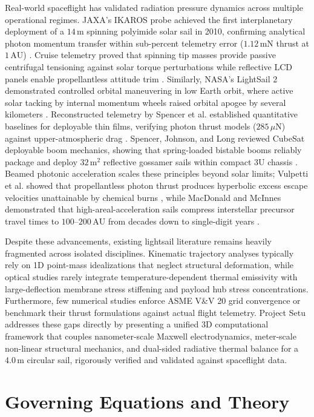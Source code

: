 \documentclass[aps,prd,reprint,superscriptaddress,nofootinbib,floatfix]{revtex4-2}
\begin{document}
Real-world spaceflight has validated radiation pressure dynamics across multiple operational regimes. JAXA's IKAROS probe achieved the first interplanetary deployment of a $14\,\mathrm{m}$ spinning polyimide solar sail in 2010, confirming analytical photon momentum transfer within sub-percent telemetry error ($1.12\,\mathrm{mN}$ thrust at $1\,\mathrm{AU}$) \cite{ref24}. Cruise telemetry proved that spinning tip masses provide passive centrifugal tensioning against solar torque perturbations while reflective LCD panels enable propellantless attitude trim \cite{ref25}. Similarly, NASA's LightSail 2 demonstrated controlled orbital maneuvering in low Earth orbit, where active solar tacking by internal momentum wheels raised orbital apogee by several kilometers \cite{ref26}. Reconstructed telemetry by Spencer et al. established quantitative baselines for deployable thin films, verifying photon thrust models ($285\,\mu\mathrm{N}$) against upper-atmospheric drag \cite{ref27}. Spencer, Johnson, and Long reviewed CubeSat deployable boom mechanics, showing that spring-loaded bistable booms reliably package and deploy $32\,\mathrm{m}^2$ reflective gossamer sails within compact 3U chassis \cite{ref28}. Beamed photonic acceleration scales these principles beyond solar limits; Vulpetti et al. showed that propellantless photon thrust produces hyperbolic excess escape velocities unattainable by chemical burns \cite{ref29}, while MacDonald and McInnes demonstrated that high-areal-acceleration sails compress interstellar precursor travel times to $100\text{--}200\,\mathrm{AU}$ from decades down to single-digit years \cite{ref30}.

Despite these advancements, existing lightsail literature remains heavily fragmented across isolated disciplines. Kinematic trajectory analyses typically rely on 1D point-mass idealizations that neglect structural deformation, while optical studies rarely integrate temperature-dependent thermal emissivity with large-deflection membrane stress stiffening and payload hub stress concentrations. Furthermore, few numerical studies enforce ASME V\&V 20 grid convergence or benchmark their thrust formulations against actual flight telemetry. Project Setu addresses these gaps directly by presenting a unified 3D computational framework that couples nanometer-scale Maxwell electrodynamics, meter-scale non-linear structural mechanics, and dual-sided radiative thermal balance for a 4.0\,m circular sail, rigorously verified and validated against spaceflight data.

\section{Governing Equations and Theory}
\label{sec:theory}
\end{document}
